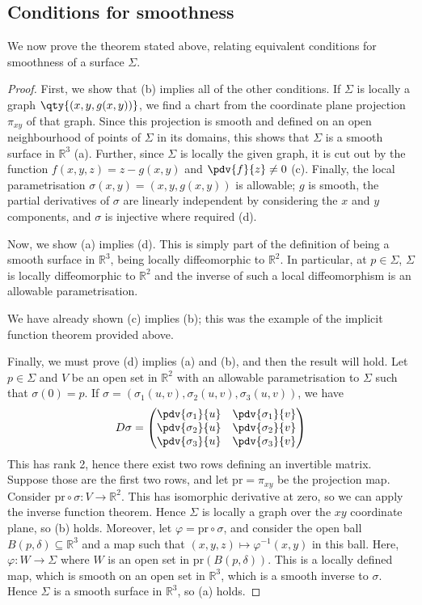 \subsection{Conditions for smoothness}
We now prove the theorem stated above, relating equivalent conditions for smoothness of a surface $\Sigma$.
\begin{proof}
	First, we show that (b) implies all of the other conditions.
	If $\Sigma$ is locally a graph $\qty{(x,y,g(x,y))}$, we find a chart from the coordinate plane projection $\pi_{xy}$ of that graph.
	Since this projection is smooth and defined on an open neighbourhood of points of $\Sigma$ in its domains, this shows that $\Sigma$ is a smooth surface in $\mathbb R^3$ (a).
	Further, since $\Sigma$ is locally the given graph, it is cut out by the function $f(x,y,z) = z - g(x,y)$ and $\pdv{f}{z} \neq 0$ (c).
	Finally, the local parametrisation $\sigma(x,y) = (x,y,g(x,y))$ is allowable; $g$ is smooth, the partial derivatives of $\sigma$ are linearly independent by considering the $x$ and $y$ components, and $\sigma$ is injective where required (d).

	Now, we show (a) implies (d).
	This is simply part of the definition of being a smooth surface in $\mathbb R^3$, being locally diffeomorphic to $\mathbb R^2$.
	In particular, at $p \in \Sigma$, $\Sigma$ is locally diffeomorphic to $\mathbb R^2$ and the inverse of such a local diffeomorphism is an allowable parametrisation.

	We have already shown (c) implies (b); this was the example of the implicit function theorem provided above.

	Finally, we must prove (d) implies (a) and (b), and then the result will hold.
	Let $p \in \Sigma$ and $V$ be an open set in $\mathbb R^2$ with an allowable parametrisation to $\Sigma$ such that $\sigma(0) = p$.
	If $\sigma = (\sigma_1(u,v), \sigma_2(u,v), \sigma_3(u,v))$, we have
	\begin{align*}
		D\sigma = \begin{pmatrix}
			\pdv{\sigma_1}{u} & \pdv{\sigma_1}{v} \\
			\pdv{\sigma_2}{u} & \pdv{\sigma_2}{v} \\
			\pdv{\sigma_3}{u} & \pdv{\sigma_3}{v}
		\end{pmatrix}
	\end{align*}
	This has rank 2, hence there exist two rows defining an invertible matrix.
	Suppose those are the first two rows, and let $\mathrm{pr} = \pi_{xy}$ be the projection map.
	Consider $\mathrm{pr} \circ \sigma \colon V \to \mathbb R^2$.
	This has isomorphic derivative at zero, so we can apply the inverse function theorem.
	Hence $\Sigma$ is locally a graph over the $xy$ coordinate plane, so (b) holds.
	Moreover, let $\varphi = \mathrm{pr} \circ \sigma$, and consider the open ball $B(p, \delta) \subseteq \mathbb R^3$ and a map such that $(x,y,z) \mapsto \varphi^{-1}(x,y)$ in this ball.
	Here, $\varphi \colon W \to \Sigma$ where $W$ is an open set in $\mathrm{pr}(B(p, \delta))$.
	This is a locally defined map, which is smooth on an open set in $\mathbb R^3$, which is a smooth inverse to $\sigma$.
	Hence $\Sigma$ is a smooth surface in $\mathbb R^3$, so (a) holds.
\end{proof}
